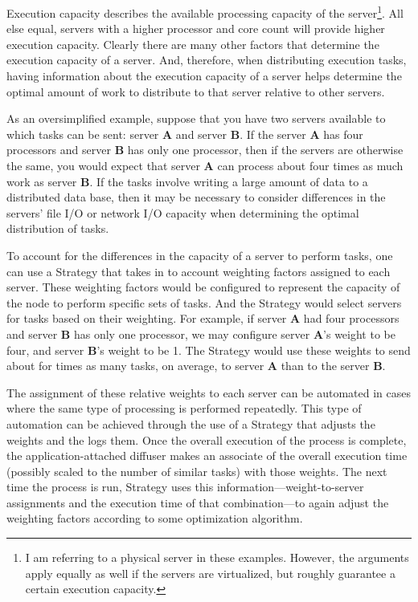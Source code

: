 \documentclass[11pt]{article}
\begin{document}
Execution capacity describes the available processing capacity of the server\footnote{I am referring to a physical server in these examples. However, the arguments apply equally as well if the servers are virtualized, but roughly guarantee a certain execution capacity.}. All else equal, servers with a higher processor and core count will provide higher execution capacity. Clearly there are many other factors that determine the execution capacity of a server. And, therefore, when distributing execution tasks, having information about the execution capacity of a server helps determine the optimal amount of work to distribute to that server relative to other servers. 

As an oversimplified example, suppose that you have two servers available to which tasks can be sent: server \textbf{A} and server \textbf{B}. If the server \textbf{A} has four processors and server \textbf{B} has only one processor, then if the servers are otherwise the same, you would expect  that server \textbf{A} can process about four times as much work as server \textbf{B}. If the tasks involve writing a large amount of data to a distributed data base, then it may be necessary to consider differences in the servers' file I/O or network I/O capacity when determining the optimal distribution of tasks.

To account for the differences in the capacity of a server to perform tasks, one can use a \textsf{Strategy} that takes in to account weighting factors assigned to each server. These weighting factors would be configured to represent the capacity of the node to perform specific sets of tasks. And the \textsf{Strategy} would select servers for tasks based on their weighting. For example, if server \textbf{A} had four processors and server \textbf{B} has only one processor, we may configure server \textbf{A}'s weight to be four, and server \textbf{B}'s weight to be 1. The \textsf{Strategy} would use these weights to send about for times as many tasks, on average, to server \textbf{A} than to the server \textbf{B}.

The assignment of these relative weights to each server can be automated in cases where the same type of processing is performed repeatedly. This type of automation can be achieved through the use of a \textsf{Strategy} that adjusts the weights and the logs them. Once the overall execution of the process is complete, the application-attached diffuser makes an associate of the overall execution time (possibly scaled to the number of similar tasks) with those weights. The next time the process is run, \textsf{Strategy} uses this information---weight-to-server assignments and the execution time of that combination---to again adjust the weighting factors according to some optimization algorithm.
\end{document}
